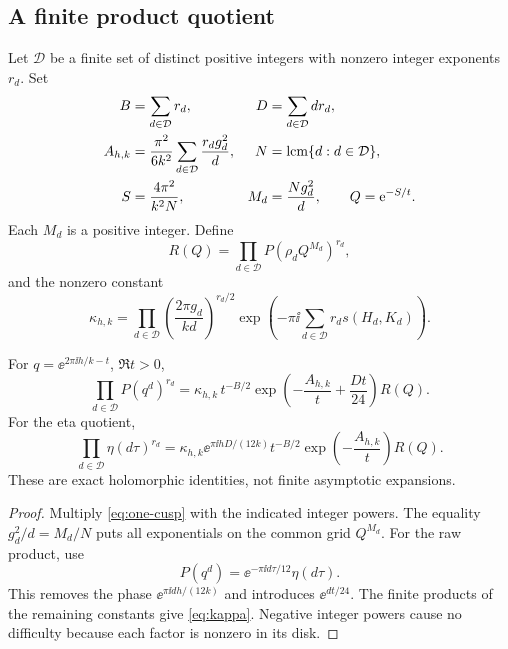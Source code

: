 \subsection{A finite product quotient}

Let \(\mathcal D\) be a finite set of distinct positive integers
with nonzero integer exponents \(r_d\).
Set
\begin{align}
 B&=\sum_{d\in\mathcal D}r_d,&
 D&=\sum_{d\in\mathcal D}dr_d,\notag\\
 A_{h,k}&=\frac{\pi^2}{6k^2}
         \sum_{d\in\mathcal D}\frac{r_dg_d^2}{d},&
 N&=\operatorname{lcm}\{d:d\in\mathcal D\},\label{eq:cusp-constants}\\
 S&=\frac{4\pi^2}{k^2N},&
 M_d&=\frac{Ng_d^2}{d},\qquad Q=\mathrm e^{-S/t}.\notag
\end{align}
Each \(M_d\) is a positive integer.  Define
\begin{equation}\label{eq:R-general}
 R(Q)=\prod_{d\in\mathcal D}P(\rho_dQ^{M_d})^{r_d},
\end{equation}
and the nonzero constant
\begin{equation}\label{eq:kappa}
 \kappa_{h,k}=
 \prod_{d\in\mathcal D}
       \left(\frac{2\pi g_d}{kd}\right)^{r_d/2}
 \exp\left(-\pi\ii
       \sum_{d\in\mathcal D}r_ds(H_d,K_d)\right).
\end{equation}

\begin{theorem}
\label{thm:cusp-normal-form}
For \(q=\ee^{2\pi\ii h/k-t}\), \(\Re t>0\),
\begin{equation}\label{eq:raw-cusp}
 \prod_{d\in\mathcal D}P(q^d)^{r_d}
 =\kappa_{h,k}\,t^{-B/2}
   \exp\left(-\frac{A_{h,k}}t+\frac{Dt}{24}\right)R(Q).
\end{equation}
For the eta quotient,
\begin{equation}\label{eq:eta-cusp}
 \prod_{d\in\mathcal D}\eta(d\tau)^{r_d}
 =\kappa_{h,k}\ee^{\pi\ii hD/(12k)}
    t^{-B/2}\exp\left(-\frac{A_{h,k}}t\right)R(Q).
\end{equation}
These are exact holomorphic identities, not finite asymptotic
expansions.
\end{theorem}
\begin{proof}
Multiply \cref{eq:one-cusp} with the indicated integer powers.
The equality \(g_d^2/d=M_d/N\) puts all exponentials on the
common grid \(Q^{M_d}\).
For the raw product, use
\[
 P(q^d)=\ee^{-\pi\ii d\tau/12}\eta(d\tau).
\]
This removes the phase \(\ee^{\pi\ii dh/(12k)}\) and introduces
\(\ee^{dt/24}\).  The finite products of the remaining constants
give \cref{eq:kappa}.
Negative integer powers cause no difficulty because each factor
is nonzero in its disk.
\end{proof}

